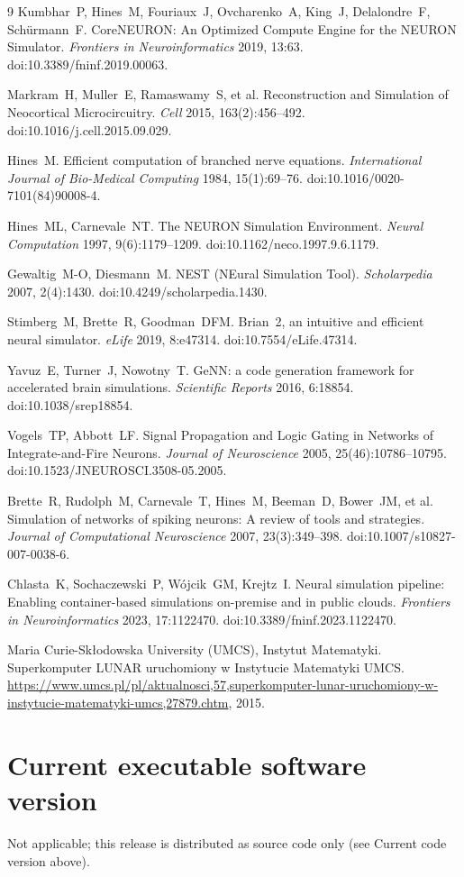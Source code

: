 \documentclass[preprint,12pt, a4paper]{elsarticle}
\begin{document}
\begin{thebibliography}{9}
Kumbhar~P, Hines~M, Fouriaux~J, Ovcharenko~A, King~J, Delalondre~F, Sch\"urmann~F.
CoreNEURON: An Optimized Compute Engine for the NEURON Simulator.
\textit{Frontiers in Neuroinformatics} 2019, 13:63. doi:10.3389/fninf.2019.00063.

Markram~H, Muller~E, Ramaswamy~S, et al.
Reconstruction and Simulation of Neocortical Microcircuitry.
\textit{Cell} 2015, 163(2):456--492. doi:10.1016/j.cell.2015.09.029.

Hines~M.
Efficient computation of branched nerve equations.
\textit{International Journal of Bio-Medical Computing} 1984, 15(1):69--76. doi:10.1016/0020-7101(84)90008-4.

Hines~ML, Carnevale~NT.
The NEURON Simulation Environment.
\textit{Neural Computation} 1997, 9(6):1179--1209. doi:10.1162/neco.1997.9.6.1179.

Gewaltig~M-O, Diesmann~M.
NEST (NEural Simulation Tool).
\textit{Scholarpedia} 2007, 2(4):1430. doi:10.4249/scholarpedia.1430.

Stimberg~M, Brette~R, Goodman~DFM.
Brian~2, an intuitive and efficient neural simulator.
\textit{eLife} 2019, 8:e47314. doi:10.7554/eLife.47314.

Yavuz~E, Turner~J, Nowotny~T.
GeNN: a code generation framework for accelerated brain simulations.
\textit{Scientific Reports} 2016, 6:18854. doi:10.1038/srep18854.

Vogels~TP, Abbott~LF.
Signal Propagation and Logic Gating in Networks of Integrate-and-Fire Neurons.
\textit{Journal of Neuroscience} 2005, 25(46):10786--10795. doi:10.1523/JNEUROSCI.3508-05.2005.

Brette~R, Rudolph~M, Carnevale~T, Hines~M, Beeman~D, Bower~JM, et al.
Simulation of networks of spiking neurons: A review of tools and strategies.
\textit{Journal of Computational Neuroscience} 2007, 23(3):349--398. doi:10.1007/s10827-007-0038-6.

Chlasta~K, Sochaczewski~P, W\'ojcik~GM, Krejtz~I.
Neural simulation pipeline: Enabling container-based simulations on-premise and in public clouds.
\textit{Frontiers in Neuroinformatics} 2023, 17:1122470. doi:10.3389/fninf.2023.1122470.

Maria Curie-Sk{\l}odowska University (UMCS), Instytut Matematyki.
Superkomputer LUNAR uruchomiony w Instytucie Matematyki UMCS.
\url{https://www.umcs.pl/pl/aktualnosci,57,superkomputer-lunar-uruchomiony-w-instytucie-matematyki-umcs,27879.chtm}, 2015.

\end{thebibliography}


\section*{Current executable software version}

Not applicable; this release is distributed as source code only (see Current code version above).
\end{document}
